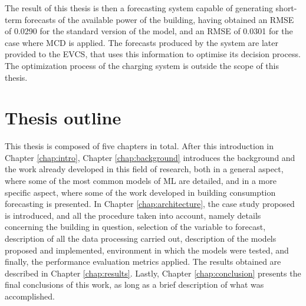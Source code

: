 The result of this thesis is then a forecasting system capable of generating short-term forecasts of the available power of the building, having obtained an \ac{RMSE} of 0.0290 for the standard version of the model, and an \ac{RMSE} of 0.0301 for the case where {MCD} is applied. The forecasts produced by the system are later provided to the \ac{EVCS}, that uses this information to optimise its decision process. The optimization process of the charging system is outside the scope of this thesis.

\section{Thesis outline}

This thesis is composed of five chapters in total. After this introduction in Chapter \ref{chap:intro}, Chapter \ref{chap:background} introduces the background and the work already developed in this field of research, both in a general aspect, where some of the most common models of ML are detailed, and in a more specific aspect, where some of the work developed in building consumption forecasting is presented. In Chapter \ref{chap:architecture}, the case study proposed is introduced, and all the procedure taken into account, namely details concerning the building in question, selection of the variable to forecast, description of all the data processing carried out, description of the models proposed and implemented, environment in which the models were tested, and finally, the performance evaluation metrics applied. The results obtained are described in Chapter \ref{chap:results}. Lastly, Chapter \ref{chap:conclusion} presents the final conclusions of this work, as long as a brief description of what was accomplished.